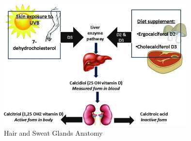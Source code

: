 \begin{figure}[htbp]
\begin{center}
\includegraphics[width=10cm]{./chapter-01-general-medical-information/vitaminD.jpg}
\end{center}
\caption{Hair and Sweat Glands Anatomy ~\cite{vitaminD}}
\label{fig:vitaminD}
\end{figure}


